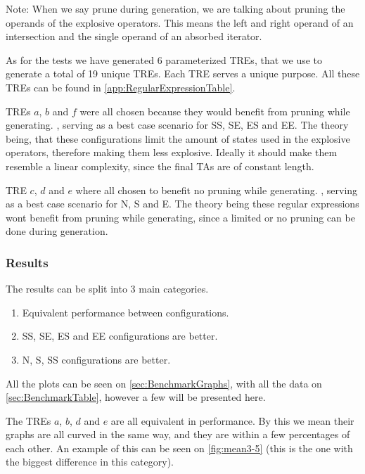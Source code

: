 Note: When we say prune during generation, we are talking about pruning the operands of the explosive operators.
This means the left and right operand of an intersection and the single operand of an absorbed iterator.

As for the tests we have generated 6 parameterized TREs, that we use to generate a total of 19 unique TREs.
Each TRE serves a unique purpose.
All these TREs can be found in \cref{app:RegularExpressionTable}.

TREs $a$, $b$ and $f$ were all chosen because they would benefit from pruning while generating.
, serving as a best case scenario for SS, SE, ES and EE.
The theory being, that these configurations limit the amount of states used in the explosive operators, therefore making them less explosive.
Ideally it should make them resemble a linear complexity, since the final TAs are of constant length.

TRE $c$, $d$ and $e$ where all chosen to benefit no pruning while generating.
, serving as a best case scenario for N, S and E.
The theory being these regular expressions wont benefit from pruning while generating, since a limited or no pruning can be done during generation.

\subsubsection{Results}
The results can be split into 3 main categories.

\begin{enumerate}
    \item Equivalent performance between configurations.
    \item SS, SE, ES and EE configurations are better.
    \item N, S, SS configurations are better.
\end{enumerate}

All the plots can be seen on \cref{sec:BenchmarkGraphs}, with all the data on \cref{sec:BenchmarkTable}, however a few will be presented here.

The TREs $a$, $b$, $d$ and $e$ are all equivalent in performance.
By this we mean their graphs are all curved in the same way, and they are within a few percentages of each other.
An example of this can be seen on \cref{fig:mean3-5} (this is the one with the biggest difference in this category).

\resizebox{\columnwidth}{!}{
    
}

